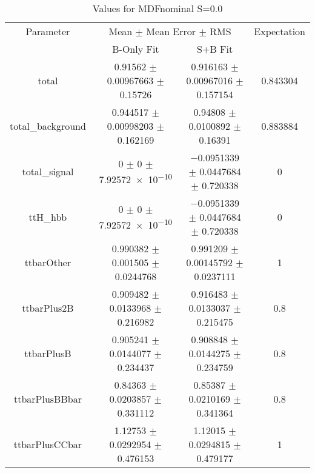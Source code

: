 \begin{table}
\centering
\caption{Values for MDFnominal S=0.0}
\begin{tabular}{cccc}
\toprule
Parameter & \multicolumn{2}{c}{Mean $\pm$ Mean Error $\pm$ RMS} & Expectation\\
 & B-Only Fit & S+B Fit & \\
\midrule
total & \num{0.91562} $\pm$ \num{0.00967663} $\pm$ \num{0.15726} & \num{0.916163} $\pm$ \num{0.00967016} $\pm$ \num{0.157154} & \num{0.843304}\\
total\_background & \num{0.944517} $\pm$ \num{0.00998203} $\pm$ \num{0.162169} & \num{0.94808} $\pm$ \num{0.0100892} $\pm$ \num{0.16391} & \num{0.883884}\\
total\_signal & \num{0} $\pm$ \num{0} $\pm$ \num{7.92572e-10} & \num{-0.0951339} $\pm$ \num{0.0447684} $\pm$ \num{0.720338} & \num{0}\\
ttH\_hbb & \num{0} $\pm$ \num{0} $\pm$ \num{7.92572e-10} & \num{-0.0951339} $\pm$ \num{0.0447684} $\pm$ \num{0.720338} & \num{0}\\
ttbarOther & \num{0.990382} $\pm$ \num{0.001505} $\pm$ \num{0.0244768} & \num{0.991209} $\pm$ \num{0.00145792} $\pm$ \num{0.0237111} & \num{1}\\
ttbarPlus2B & \num{0.909482} $\pm$ \num{0.0133968} $\pm$ \num{0.216982} & \num{0.916483} $\pm$ \num{0.0133037} $\pm$ \num{0.215475} & \num{0.8}\\
ttbarPlusB & \num{0.905241} $\pm$ \num{0.0144077} $\pm$ \num{0.234437} & \num{0.908848} $\pm$ \num{0.0144275} $\pm$ \num{0.234759} & \num{0.8}\\
ttbarPlusBBbar & \num{0.84363} $\pm$ \num{0.0203857} $\pm$ \num{0.331112} & \num{0.85387} $\pm$ \num{0.0210169} $\pm$ \num{0.341364} & \num{0.8}\\
ttbarPlusCCbar & \num{1.12753} $\pm$ \num{0.0292954} $\pm$ \num{0.476153} & \num{1.12015} $\pm$ \num{0.0294815} $\pm$ \num{0.479177} & \num{1}\\
\bottomrule
\end{tabular}
\end{table}